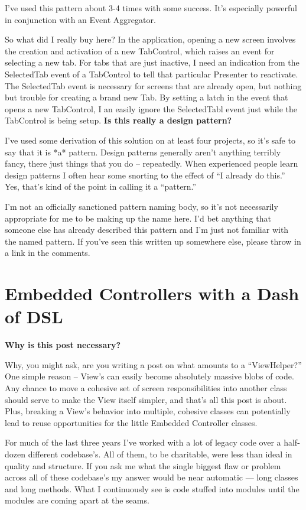 \documentclass{article}
\begin{document}
{I've used this pattern about 3-4 times with some success.  It's especially powerful in conjunction with an Event Aggregator.

So what did I really buy here?  In the application, opening a new screen involves the creation and activation of a new TabControl, which raises an event for selecting a new tab.  For tabs that are just inactive, I need an indication from the SelectedTab event of a TabControl to tell that particular Presenter to reactivate.  The SelectedTab event is necessary for screens that are already open, but nothing but trouble for creating a brand new Tab.  By setting a latch in the event that opens a new TabControl, I an easily ignore the SelectedTabl event just while the TabControl is being setup.
\Large {\textbf{Is this really a design pattern?}}

I've used some derivation of this solution on at least four projects, so it's safe to say that it is *a* pattern.  Design patterns generally aren't anything terribly fancy, there just things that you do – repeatedly.  When experienced people learn design patterns I often hear some snorting to the effect of “I already do this.”  Yes, that's kind of the point in calling it a “pattern.” 

I'm not an officially sanctioned pattern naming body, so it's not necessarily appropriate for me to be making up the name here.  I'd bet anything that someone else has already described this pattern and I'm just not familiar with the named pattern.  If you've seen this written up somewhere else, please throw in a link in the comments.

\section{ Embedded Controllers with a Dash of DSL } 

\Large {\textbf{Why is this post necessary?}}

Why, you might ask, are you writing a post on what amounts to a “ViewHelper?”  One simple reason – View's can easily become absolutely massive blobs of code.  Any chance to move a cohesive set of screen responsibilities into another class should serve to make the View itself simpler, and that's all this post is about.  Plus, breaking a View's behavior into multiple, cohesive classes can potentially lead to reuse opportunities for the little Embedded Controller classes.

For much of the last three years I've worked with a lot of legacy code over a half-dozen different codebase's.  All of them, to be charitable, were less than ideal in quality and structure.  If you ask me what the single biggest flaw or problem across all of these codebase's my answer would be near automatic — long classes and long methods.  What I continuously see is code stuffed into modules until the modules are coming apart at the seams. 

}
\end{document}
